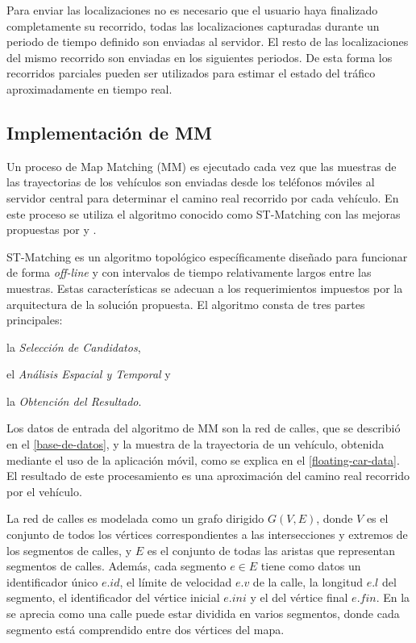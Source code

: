 Para enviar las localizaciones no es necesario que el usuario haya finalizado completamente su recorrido, todas las localizaciones capturadas durante un periodo de tiempo definido son enviadas al servidor. El resto de las localizaciones del mismo recorrido son enviadas en los siguientes periodos. De esta forma los recorridos parciales pueden ser utilizados para estimar el estado del tráfico aproximadamente en tiempo real.

\subsection{Implementación de MM}
\label{implementacion_mm}

Un proceso de Map Matching (MM) es ejecutado cada vez que las muestras de las trayectorias de los vehículos son enviadas desde los teléfonos móviles al servidor central para determinar el camino real recorrido por cada vehículo. En este proceso se utiliza el algoritmo conocido como ST-Matching\cite{lou2009map} con las mejoras propuestas por \cite{budigm2012algorithm} y \cite{sakic2012map}. 

ST-Matching es un algoritmo topológico específicamente diseñado para funcionar de forma \emph{off-line} y con intervalos de tiempo relativamente largos entre las muestras. Estas características se adecuan a los requerimientos impuestos por la arquitectura de la solución propuesta.  El algoritmo consta de tres partes principales: \begin{enumerate*}[a)]
\item la \emph{Selección de Candidatos},
\item el \emph{Análisis Espacial y Temporal} y
\item la \emph{Obtención del Resultado}.
\end{enumerate*}

Los datos de entrada del algoritmo de MM son la red de calles, que se describió en el \cref{base-de-datos}, y la muestra de la trayectoria de un vehículo, obtenida mediante el uso de la aplicación móvil, como se explica en el \cref{floating-car-data}. El resultado de este procesamiento es una aproximación del camino real recorrido por el vehículo.

La red de calles es modelada como un grafo dirigido $G(V,E)$, donde $V$ es el conjunto de todos los vértices correspondientes a las intersecciones y extremos de los segmentos de calles, y $E$ es el conjunto de todas las aristas que representan segmentos de calles. Además, cada segmento $e \in E$ tiene como datos un identificador único $e.id$, el límite de velocidad $e.v$ de la calle, la longitud $e.l$ del segmento, el identificador del vértice inicial $e.ini$ y el del vértice final $e.fin$. En la  se aprecia como una calle puede estar dividida en varios segmentos, donde cada segmento está comprendido entre dos vértices del mapa.


